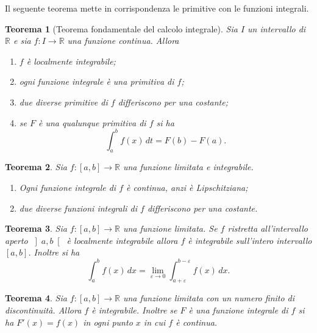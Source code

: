 \documentclass[italian,a4paper]{article}
\newcommand{\R}{\mathbb{R}}
\renewcommand{\epsilon}{\varepsilon}
\newtheorem{theorem}{Teorema}
\begin{document}
Il seguente teorema mette in corrispondenza le primitive con le
funzioni integrali.

\begin{theorem}[Teorema fondamentale del calcolo integrale]
Sia $I$ un intervallo di $\R$ e sia $f\colon I\to \R$ una funzione
continua. Allora 
\begin{enumerate}
\item
$f$ \`e localmente integrabile;
\item
ogni funzione integrale \`e una primitiva di $f$;
\item
due diverse primitive di $f$ differiscono per una costante;
\item
se $F$ \`e una qualunque primitiva di $f$ si ha
\[
	\int_a^b f(x)\, dt = F(b) - F(a).
\]
\end{enumerate}
\end{theorem}

\begin{theorem}
Sia $f\colon [a,b]\to \R$ una funzione limitata e integrabile. 
\begin{enumerate}
\item
	Ogni funzione integrale di $f$ \`e continua, anzi \`e Lipschitziana;
\item	
	due diverse funzioni integrali di $f$ differiscono per una costante.
\end{enumerate}
\end{theorem}

\begin{theorem}
Sia $f\colon [a,b]\to\R$ una funzione limitata.
Se $f$ ristretta all'intervallo aperto $\left]a,b\right[$ \`e
localmente integrabile allora $f$ \`e integrabile
sull'intero intervallo $[a,b]$. Inoltre si ha 
\[
	\int_a^b f(x)\, dx =\lim_{\epsilon\to
	0}\int_{a+\epsilon}^{b-\epsilon} f(x)\, dx.
\]
\end{theorem}

\begin{theorem}
Sia $f\colon [a,b]\to\R$ una funzione limitata con un numero finito di
discontinuit\`a. Allora $f$ \`e integrabile. Inoltre se $F$ \`e una
funzione integrale di $f$ si ha $F'(x)=f(x)$ 
in ogni punto $x$ in cui $f$ \`e continua.
\end{theorem}
\end{document}
